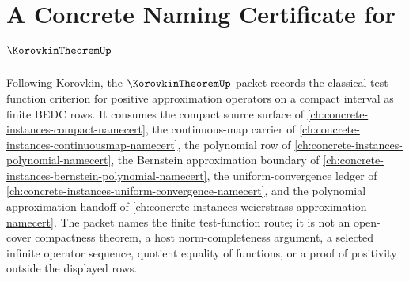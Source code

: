 \chapter{A Concrete Naming Certificate for $\KorovkinTheoremUp$}
\label{ch:concrete-instances-korovkin-theorem-namecert}

Following Korovkin, the $\KorovkinTheoremUp$ packet records the classical test-function criterion for positive approximation operators on a compact interval as finite BEDC rows. It consumes the compact source surface of \autoref{ch:concrete-instances-compact-namecert}, the continuous-map carrier of \autoref{ch:concrete-instances-continuousmap-namecert}, the polynomial row of \autoref{ch:concrete-instances-polynomial-namecert}, the Bernstein approximation boundary of \autoref{ch:concrete-instances-bernstein-polynomial-namecert}, the uniform-convergence ledger of \autoref{ch:concrete-instances-uniform-convergence-namecert}, and the polynomial approximation handoff of \autoref{ch:concrete-instances-weierstrass-approximation-namecert}. The packet names the finite test-function route; it is not an open-cover compactness theorem, a host norm-completeness argument, a selected infinite operator sequence, quotient equality of functions, or a proof of positivity outside the displayed rows.

